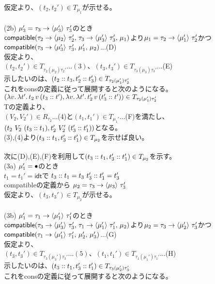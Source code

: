仮定より、$(t_2,t_2')\in T_{\mu_1}$が示せる。\\
\\
(2b) $\mu_3'=\Trail{\tau_3}{\tau_3'}{\mu_3'}$のとき\\
$\Compatible{\Trail{\tau_2}{\tau_2'}{\mu_2}}{\Trail{\tau_3}{\tau_3'}{\mu_3'}}{\mu_1}$より$\mu_1 = \Trail{\tau_2}{\tau_2'}{\mu_1'}$かつ$\Compatible{\Trail{\tau_3}{\tau_3'}{\mu_3'}}{\mu_1'}{\mu_2}$...(D)\\
仮定より、\\
$(t_2, t_2')\in T_{\tau_2(\mu_2)\tau_2'}...(3)、(t_3, t_3')\in T_{\tau_3(\mu_3)\tau_3'}$...(E)\\
示したいのは、$(\Cons{t_2}{t_3}, \Cons{t_2'}{t_3'})\in T_{\tau_2(\mu_1')\tau_2'}$\\これを\textsf{cons}の定義に従って展開すると次のようになる。\\
$(\Lam{v}{\Lam{t'}{t_2\,v\,(\Cons{t_3}{t'})}}, \Lam{v}{\Lam{t'}{t_2'\,v\,(\Cons{t_3'}{t'})}})\in T_{\tau_2(\mu_1')\tau_2'}$\\
Tの定義より、\\
$(V_2,V_2')\in R_{\tau_2}$...(4)と$(t_1,t_1')\in T_{\mu_1'}$...(F)を満たし、$(t_2\ V_2\ (\Cons{t_3}{t_1}),t_2'\ V_2'\ (\Cons{t_3'}{t_1'}))$となる。\\
(3),(4)より$(\Cons{t_3}{t_1},\Cons{t_3'}{t_1'})\in T_{\mu_2}$を示せば良い。\\
\\
次に(D),(E),(F)を利用して$(\Cons{t_3}{t_1},\Cons{t_3'}{t_1'})\in T_{\mu_2}$を示す。\\
(3a) $\mu_1'=\Bullet$のとき\\
$t_1=t_1'=\textsf{idt}$で $\Cons{t_3}{t_1}=t_3\ \Cons{t_3'}{t_1'}=t_3'$\\
\textsf{compatible}の定義から $\mu_2 = \Trail{\tau_3}{\tau_3'}{\mu_3}$\\
仮定より、$(t_3,t_3')\in T_{\mu_2}$が示せる。\\
\\
(3b) $\mu_1'=\Trail{\tau_1}{\tau_1'}{\mu_1'}$のとき\\
$\Compatible{\Trail{\tau_3}{\tau_3'}{\mu_3'}}{\Trail{\tau_1}{\tau_1'}{\mu_1'}}{\mu_2}$より$\mu_2 = \Trail{\tau_3}{\tau_3'}{\mu_2'}$かつ$\Compatible{\Trail{\tau_1}{\tau_1'}{\mu_1'}}{\mu_2'}{\mu_3'}$...(G)\\
仮定より、\\
$(t_3, t_3')\in T_{\tau_3(\mu_3')\tau_3'}...(5)、(t_1, t_1')\in T_{\tau_1(\mu_1')\tau_1'}$...(H)\\
示したいのは、$(\Cons{t_3}{t_1}, \Cons{t_3'}{t_1'})\in T_{\tau_3(\mu_2')\tau_3'}$\\これを\textsf{cons}の定義に従って展開すると次のようになる。\\
